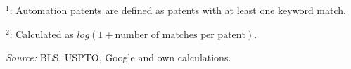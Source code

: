 \begin{table}
\begin{small}
\begin{threeparttable}
\begin{tablenotes}
\item $^1$: Automation patents are defined as patents with at least one keyword match.
\item $^2$: Calculated as $log(1 + \text{number of matches per patent})$.
\item \textit{Source:} BLS, USPTO, Google and own calculations.
\end{tablenotes}
\end{threeparttable}
\end{small}
\end{table}
